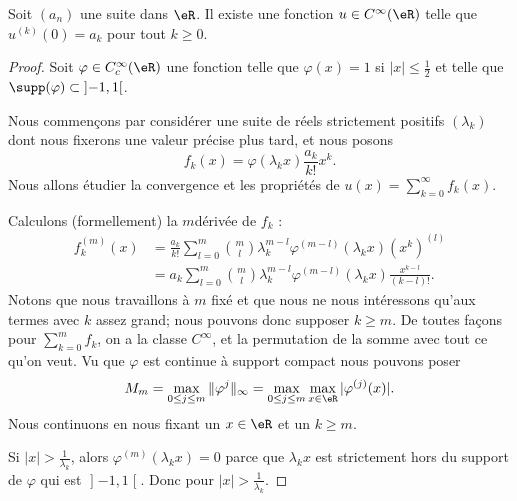 \begin{lemma} \label{LemRENlIEL}
	Soit \( (a_n)\) une suite dans \( \eR\). Il existe une fonction \( u\in C^{\infty}(\eR)\) telle que \( u^{(k)}(0)=a_k\) pour tout \( k\geq 0\).
\end{lemma}

\begin{proof}
	Soit \( \varphi\in C^{\infty}_c(\eR)\) une fonction telle que \( \varphi(x)=1\) si \( | x |\leq \frac{ 1 }{2}\) et telle que \( \supp(\varphi)\subset\mathopen] -1 , 1 \mathclose[\).

		Nous commençons par considérer une suite de réels strictement positifs \( (\lambda_k)\) dont nous fixerons une valeur précise plus tard, et nous posons
		\begin{equation}
			f_k(x)=\varphi(\lambda_k x)\frac{ a_k }{ k! }x^k.
		\end{equation}
		Nous allons étudier la convergence et les propriétés de \( u(x)=\sum_{k=0}^{\infty}f_k(x)\).

		Calculons (formellement) la \( m\)\ieme dérivée de \( f_k\) :
		\begin{subequations}
			\begin{align}
				f_k^{(m)}(x) & =\frac{ a_k }{ k! }\sum_{l=0}^{m}\binom{ m }{ l }\lambda_k^{m-l}\varphi^{(m-l)}(\lambda_kx)(x^k)^{(l)}  \\
				             & =a_k\sum_{l=0}^{m}\binom{ m }{ l }\lambda_k^{m-l}\varphi^{(m-l)}(\lambda_kx)\frac{ x^{k-l} }{ (k-l)! }.
			\end{align}
		\end{subequations}
		Notons que nous travaillons à \( m\) fixé et que nous ne nous intéressons qu'aux termes avec \( k\) assez grand; nous pouvons donc supposer \( k\geq m\). De toutes façons pour \( \sum_{k=0}^mf_k\), on a la classe \(  C^{\infty}\), et la permutation de la somme avec tout ce qu'on veut. Vu que \( \varphi\) est continue à support compact nous pouvons poser
		\begin{equation}
			M_m=\max_{0\leq j\leq m}\| \varphi^{j} \|_{\infty}=\max_{0\leq j\leq m}\max_{x\in \eR}| \varphi^{(j)}(x) |.
		\end{equation}
		Nous continuons en nous fixant un \( x\in \eR\) et un \( k\geq m\).

		Si \( | x |>\frac{1}{ \lambda_k }\), alors \( \varphi^{(m)}(\lambda_kx)=0\) parce que \( \lambda_kx\) est strictement hors du support de \( \varphi\) qui est \( \mathopen] -1 , 1 \mathclose[\). Donc pour \( | x |>\frac{1}{ \lambda_k }\).


\end{proof}

